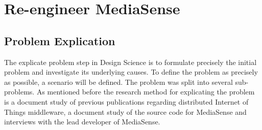 \chapter{Re-engineer MediaSense}
\section{Problem Explication}
The explicate problem step in Design Science \cite{johannesson2012design} is to formulate precisely the initial problem and investigate its underlying causes. To define the problem as precisely as possible, a scenario will be defined. The problem was split into several sub-problems. As mentioned before the research method for explicating the problem is a document study of previous publications regarding distributed Internet of Things middleware, a document study of the source code for MediaSense and interviews with the lead developer of MediaSense. 

%
%

